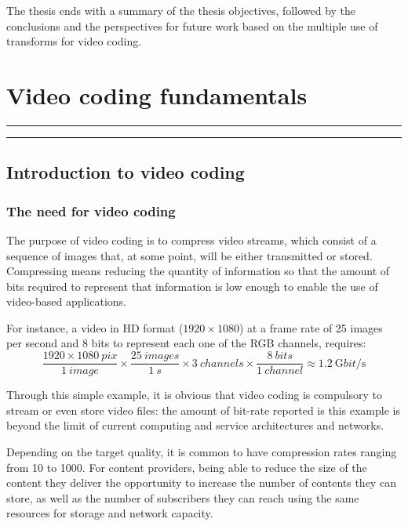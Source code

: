 \documentclass[11pt,a4paper,openright,twoside]{book}
\providecommand{\chaptertoc}{
	\startcontents[chapters]
	\hrule
	\vspace{1em}
	\printcontents[chapters]{}{1}{{\sf\large\bfseries Contents}}
	\hrule
}
\numberwithin{equation}{section} %
\numberwithin{figure}{section} %
\numberwithin{table}{section} %
\begin{document}
The thesis ends with a summary of the thesis objectives, followed by the
conclusions and the perspectives for future work based on the multiple use of
transforms for video coding.

\acresetall %

\chapter{Video coding fundamentals}
\label{cha:video_coding_fundamentals}
\chaptertoc

\section{Introduction to video coding}
\label{sec:introduction_to_video_coding}

\subsection{The need for video coding}
\label{sub:the_need_for_video_coding}

The purpose of video coding is to compress video streams, which consist of a
sequence of images that, at some point, will be either transmitted or stored.
Compressing means reducing the quantity of information so that the amount of
bits required to represent that information is low enough to enable the use of
video-based applications.

For instance, a video in \ac{HD} format ($1920 \times 1080$)
at a frame rate of 25 images per second and 8 bits to represent each one
of the \ac{RGB} channels, requires:
\[
	\frac{1920\times\SI{1080}{pix}}{\SI{1}{image}}
	\times \frac{\SI{25}{images}}{\SI{1}{s}}
	\times \SI{3}{channels} \times \frac{\SI{8}{bits}}{\SI{1}{channel}}
	\approx \SI{1.2}{\giga bit/\second}
\]

Through this simple example, it is obvious that video coding is compulsory
to stream or even store video files:
the amount of bit-rate reported is this example is beyond the limit of current
computing and service architectures and networks.

Depending on the target quality, it is common to have compression rates
ranging from 10 to 1000.
For content providers, being able to reduce the size of the content they
deliver the opportunity to increase the number of contents they can store, as
well as the number of subscribers they can reach using the same resources for
storage and network capacity.
\end{document}
